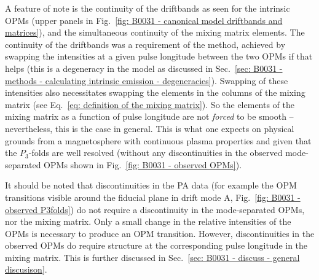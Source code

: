 A feature of note is the continuity of the driftbands as seen for the intrinsic OPMs (upper panels in Fig.~\ref{fig: B0031 - canonical model driftbands and matrices}), and the simultaneous continuity of the mixing matrix elements. The continuity of the driftbands was a requirement of the method, achieved by swapping the intensities at a given pulse longitude between the two OPMs if that helps (this is a degeneracy in the model as discussed in Sec.~\ref{sec: B0031 - methods - calculating intrinsic emission - degeneracies}). Swapping of these intensities also necessitates swapping the elements in the columns of the mixing matrix (see Eq.~\eqref{eq: definition of the mixing matrix}). So the elements of the mixing matrix as a function of pulse longitude are not \textit{forced} to be smooth -- nevertheless, this is the case in general. This is what one expects on physical grounds from a magnetosphere with continuous plasma properties and given that the $P_3$-folds are well resolved (without any discontinuities in the observed mode-separated OPMs shown in Fig.~\ref{fig: B0031 - observed OPMs}).

It should be noted that discontinuities in the PA data (for example the OPM transitions visible around the fiducial plane in drift mode A, Fig.~\ref{fig: B0031 - observed P3folds}) do not require a discontinuity in the mode-separated OPMs, nor the mixing matrix. Only a small change in the relative intensities of the OPMs is necessary to produce an OPM transition. However, discontinuities in the observed OPMs do require structure at the corresponding pulse longitude in the mixing matrix. This is further discussed in Sec.~\ref{sec: B0031 - discuss - general discusison}.


